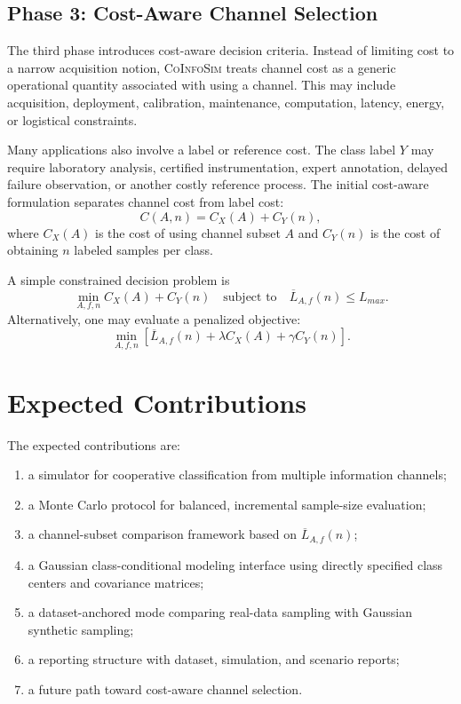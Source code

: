 \documentclass[11pt,a4paper]{article}
\newcommand{\CoInfoSim}{\textsc{CoInfoSim}}
\begin{document}
\subsection{Phase 3: Cost-Aware Channel Selection}

The third phase introduces cost-aware decision criteria. Instead of limiting cost to a narrow acquisition notion, \CoInfoSim{} treats channel cost as a generic operational quantity associated with using a channel. This may include acquisition, deployment, calibration, maintenance, computation, latency, energy, or logistical constraints.

Many applications also involve a label or reference cost. The class label $Y$ may require laboratory analysis, certified instrumentation, expert annotation, delayed failure observation, or another costly reference process. The initial cost-aware formulation separates channel cost from label cost:
\[
    C(A,n)=C_X(A)+C_Y(n),
\]
where $C_X(A)$ is the cost of using channel subset $A$ and $C_Y(n)$ is the cost of obtaining $n$ labeled samples per class.

A simple constrained decision problem is
\[
    \min_{A,f,n} C_X(A)+C_Y(n)
    \quad\text{subject to}\quad
    \overline{L}_{A,f}(n)\leq L_{max}.
\]
Alternatively, one may evaluate a penalized objective:
\[
    \min_{A,f,n}
    \left[\overline{L}_{A,f}(n)+\lambda C_X(A)+\gamma C_Y(n)\right].
\]

\section{Expected Contributions}

The expected contributions are:
\begin{enumerate}
    \item a simulator for cooperative classification from multiple information channels;
    \item a Monte Carlo protocol for balanced, incremental sample-size evaluation;
    \item a channel-subset comparison framework based on $\overline{L}_{A,f}(n)$;
    \item a Gaussian class-conditional modeling interface using directly specified class centers and covariance matrices;
    \item a dataset-anchored mode comparing real-data sampling with Gaussian synthetic sampling;
    \item a reporting structure with dataset, simulation, and scenario reports;
    \item a future path toward cost-aware channel selection.
\end{enumerate}
\end{document}
